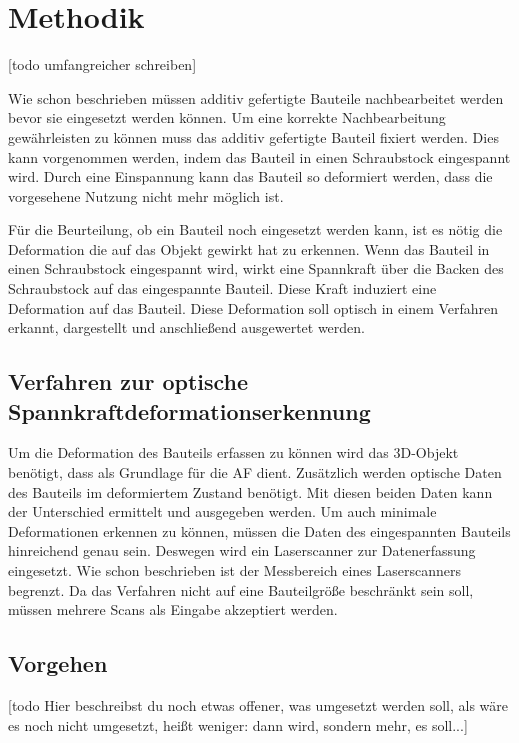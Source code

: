 

\chapter{Methodik}

[todo umfangreicher schreiben]

Wie schon beschrieben müssen additiv gefertigte Bauteile nachbearbeitet werden
bevor sie eingesetzt werden können. 
Um eine korrekte Nachbearbeitung gewährleisten zu können muss das additiv 
gefertigte Bauteil fixiert werden. 
Dies kann vorgenommen werden, indem das Bauteil in einen Schraubstock eingespannt wird.
Durch eine Einspannung kann das Bauteil so deformiert werden, 
dass die vorgesehene Nutzung nicht mehr möglich ist. 

Für die Beurteilung, ob ein Bauteil noch eingesetzt werden kann, ist es nötig die 
Deformation die auf das Objekt gewirkt hat zu erkennen. Wenn das Bauteil in einen 
Schraubstock eingespannt wird, wirkt eine Spannkraft über die Backen des Schraubstock
auf das eingespannte Bauteil.
Diese Kraft induziert eine Deformation auf das Bauteil. 
Diese Deformation soll optisch in einem Verfahren erkannt, dargestellt und 
anschließend ausgewertet werden.

\section{Verfahren zur optische Spannkraftdeformationserkennung}

Um die Deformation des Bauteils erfassen zu können wird das 3D-Objekt benötigt, 
dass als Grundlage für die AF dient. Zusätzlich werden optische Daten des Bauteils 
im deformiertem Zustand benötigt. Mit diesen beiden Daten kann der Unterschied 
ermittelt und ausgegeben werden.
Um auch minimale Deformationen erkennen zu können, müssen die Daten des 
eingespannten Bauteils hinreichend genau sein. Deswegen wird ein Laserscanner zur 
Datenerfassung eingesetzt.
Wie schon beschrieben ist der Messbereich eines Laserscanners begrenzt. Da das 
Verfahren nicht auf eine Bauteilgröße beschränkt sein soll, müssen mehrere Scans als 
Eingabe akzeptiert werden.

\section{Vorgehen}
[todo Hier beschreibst du noch etwas offener, was umgesetzt werden soll, 
als wäre es noch nicht umgesetzt, heißt weniger: dann wird, sondern mehr, es soll...]

